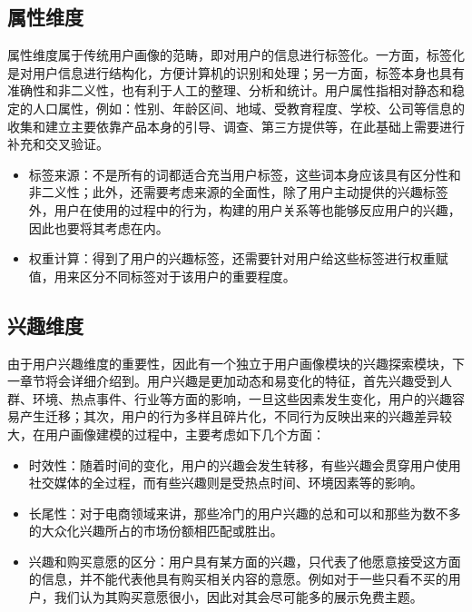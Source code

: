         \subsection{属性维度}
        属性维度属于传统用户画像的范畴，即对用户的信息进行标签化。一方面，标签化是对用户信息进行结构化，方便计算机的识别和处理；另一方面，标签本身也具有准确性和非二义性，也有利于人工的整理、分析和统计。用户属性指相对静态和稳定的人口属性，例如：性别、年龄区间、地域、受教育程度、学校、公司等信息的收集和建立主要依靠产品本身的引导、调查、第三方提供等，在此基础上需要进行补充和交叉验证。
        \begin{itemize}
        \item 标签来源：不是所有的词都适合充当用户标签，这些词本身应该具有区分性和非二义性；此外，还需要考虑来源的全面性，除了用户主动提供的兴趣标签外，用户在使用的过程中的行为，构建的用户关系等也能够反应用户的兴趣，因此也要将其考虑在内。
        \item 权重计算：得到了用户的兴趣标签，还需要针对用户给这些标签进行权重赋值，用来区分不同标签对于该用户的重要程度。
        \end{itemize}

        \subsection{兴趣维度}
        由于用户兴趣维度的重要性，因此有一个独立于用户画像模块的兴趣探索模块，下一章节将会详细介绍到。用户兴趣是更加动态和易变化的特征，首先兴趣受到人群、环境、热点事件、行业等方面的影响，一旦这些因素发生变化，用户的兴趣容易产生迁移；其次，用户的行为多样且碎片化，不同行为反映出来的兴趣差异较大，在用户画像建模的过程中，主要考虑如下几个方面：
        \begin{itemize}
        \item 时效性：随着时间的变化，用户的兴趣会发生转移，有些兴趣会贯穿用户使用社交媒体的全过程，而有些兴趣则是受热点时间、环境因素等的影响。
        \item 长尾性：对于电商领域来讲，那些冷门的用户兴趣的总和可以和那些为数不多的大众化兴趣所占的市场份额相匹配或胜出。
        \item 兴趣和购买意愿的区分：用户具有某方面的兴趣，只代表了他愿意接受这方面的信息，并不能代表他具有购买相关内容的意愿。例如对于一些只看不买的用户，我们认为其购买意愿很小，因此对其会尽可能多的展示免费主题。
        \end{itemize}

